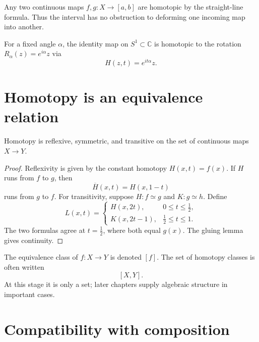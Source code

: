 \begin{example}
\label{ex:viii01-interval-target}
Any two continuous maps \(f,g:X\to [a,b]\) are homotopic by the straight-line
formula.  Thus the interval has no obstruction to deforming one incoming map
into another.
\end{example}

\begin{example}
\label{ex:viii01-circle-rotation}
For a fixed angle \(\alpha\), the identity map on \(S^1\subset\mathbb C\) is
homotopic to the rotation \(R_\alpha(z)=e^{i\alpha}z\) via
\[
H(z,t)=e^{it\alpha}z.
\]
\end{example}

\section{Homotopy is an equivalence relation}

\begin{theorem}
\label{thm:viii01-equivalence}
Homotopy is reflexive, symmetric, and transitive on the set of continuous maps
\(X\to Y\).
\end{theorem}

\begin{proof}
Reflexivity is given by the constant homotopy \(H(x,t)=f(x)\).
If \(H\) runs from \(f\) to \(g\), then
\[
\overline H(x,t)=H(x,1-t)
\]
runs from \(g\) to \(f\).  For transitivity, suppose \(H:f\simeq g\) and
\(K:g\simeq h\).  Define
\[
L(x,t)=
\begin{cases}
H(x,2t),&0\le t\le \frac12,\\[2mm]
K(x,2t-1),&\frac12\le t\le1.
\end{cases}
\]
The two formulas agree at \(t=\frac12\), where both equal \(g(x)\).  The gluing
lemma gives continuity.
\end{proof}

\begin{remark}
\label{rem:viii01-classes}
The equivalence class of \(f:X\to Y\) is denoted \([f]\).  The set of homotopy
classes is often written
\[
[X,Y].
\]
At this stage it is only a set; later chapters supply algebraic structure in
important cases.
\end{remark}

\section{Compatibility with composition}

